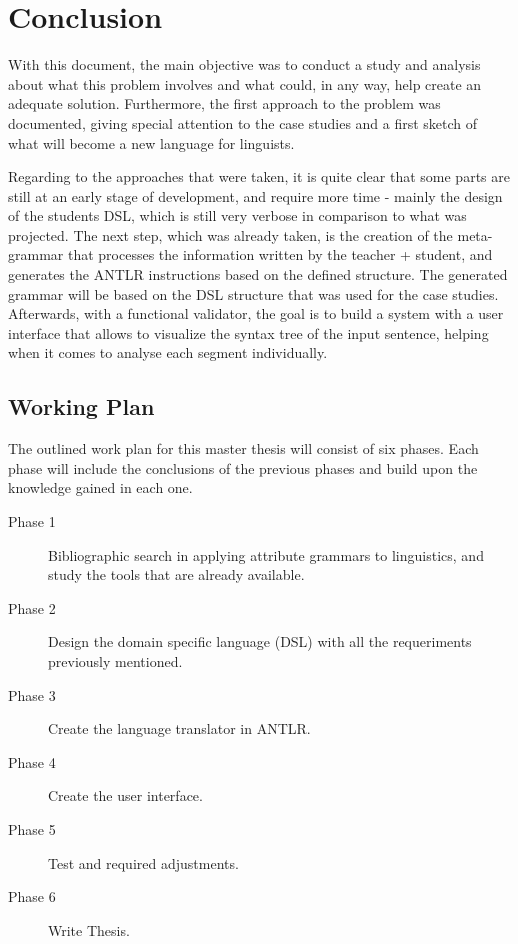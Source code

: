\chapter{Conclusion} \label{conclusion}

With this document, the main objective was to conduct a study and analysis about what this problem involves and what could, in any way, help create an adequate solution. Furthermore, the first approach to the problem was documented, giving special attention to the case studies and a first sketch of what will become a new language for linguists.

Regarding to the approaches that were taken, it is quite clear that some parts are still at an early stage of development, and require more time - mainly the design of the students \textsc{DSL}, which is still very verbose in comparison to what was projected. The next step, which was already taken, is the creation of the meta-grammar that processes the information written by the teacher + student, and generates the \textsc{ANTLR} instructions based on the defined structure. The generated grammar will be based on the \textsc{DSL} structure that was used for the case studies. Afterwards, with a functional validator, the goal is to build a system with a user interface that allows to visualize the syntax tree of the input sentence, helping when it comes to analyse each segment individually.

\section{Working Plan}
The outlined work plan for this master thesis will consist of six phases. Each phase will include the conclusions of the previous phases and build upon the knowledge gained in each one.

\begin{description}
	\item[Phase 1] Bibliographic search in applying attribute grammars to linguistics, and study the tools that are already available.
	\item[Phase 2] Design the domain specific language (\textsc{DSL}) with all the requeriments previously mentioned.
	\item[Phase 3] Create the language translator in \textsc{ANTLR}.
	\item[Phase 4] Create the user interface.
	\item[Phase 5] Test and required adjustments.
	\item[Phase 6] Write Thesis.
\end{description}

